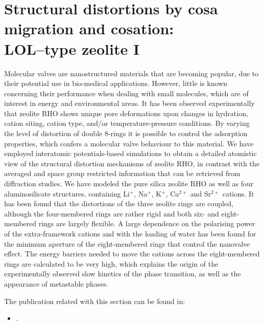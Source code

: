 %
\chapter{Structural distortions by cosa migration and cosation:\\ LOL--type zeolite I}
\label{chap_RHO2}
Molecular valves are nanostructured materials that are becoming popular, due to their potential use in bio-medical applications. However, little is known concerning their performance when dealing with small molecules, which are of interest in energy and environmental areas. It has been observed experimentally that zeolite RHO shows unique pore deformations upon changes in hydration, cation siting, cation type, and/or temperature-pressure conditions. By varying the level of distortion of double 8-rings it is possible to control the adsorption properties, which confers a molecular valve behaviour to this material. We have employed interatomic potentials-based simulations to obtain a detailed atomistic view of the structural distortion mechanisms of zeolite RHO, in contrast with the averaged and space group restricted information that can be retrieved from diffraction studies. We have modeled the pure silica zeolite RHO as well as four aluminosilicate structures, containing Li$^+$, Na$^+$, K$^+$, Ca$^{2+}$ and Sr$^{2+}$ cations. It has been found that the distortions of the three zeolite rings are coupled, although the four-membered rings are rather rigid and both six- and eight-membered rings are largely flexible. A large dependence on the polarising power of the extra-framework cations and with the loading of water has been found for the minimum aperture of the eight-membered rings that control the nanovalve effect. The energy barriers needed to move the cations across the eight-membered rings are calculated to be very high, which explains the origin of the experimentally observed slow kinetics of the phase transition, as well as the appearance of metastable phases.


The publication related with this section can be found in:
\begin{small}
\begin{itemize}
\item {}.
\end{itemize}
\end{small}

